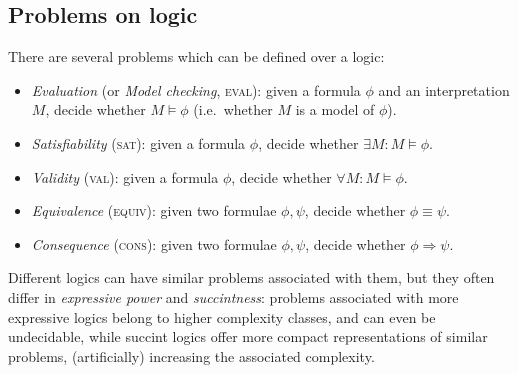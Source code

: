 \documentclass{article}
\theoremstyle{example}
\theoremstyle{remark}
\newcommand{\Implies}{\Longrightarrow}
\begin{document}
\subsection{Problems on logic}
There are several problems which can be defined over a logic:

\begin{itemize}
	\item \emph{Evaluation} (or \emph{Model checking}, \textsc{eval}): given a formula
	      \(\phi \) and an interpretation \(M\), decide whether \(M \models \phi \)
	      (i.e.\ whether \(M\) is a model of \(\phi \)).
	\item \emph{Satisfiability} (\textsc{sat}): given a formula \(\phi \), decide whether \(\exists
	      M\colon M \models
	      \phi \).
	\item \emph{Validity} (\textsc{val}): given a formula \(\phi \), decide whether \(\forall M\colon M
	      \models \phi \).
	\item \emph{Equivalence} (\textsc{equiv}): given two formulae \(\phi, \psi \), decide whether
	      \(\phi \equiv \psi \).
	\item \emph{Consequence} (\textsc{cons}): given two formulae \(\phi, \psi \), decide
	      whether \(\phi \Implies \psi \).
\end{itemize}

Different logics can have similar problems associated with them, but they often differ in
\emph{expressive power} and \emph{succintness}: problems associated with more expressive logics
belong to higher complexity classes, and can even be undecidable, while succint logics offer
more compact representations of similar problems, (artificially) increasing the associated complexity.
\end{document}
